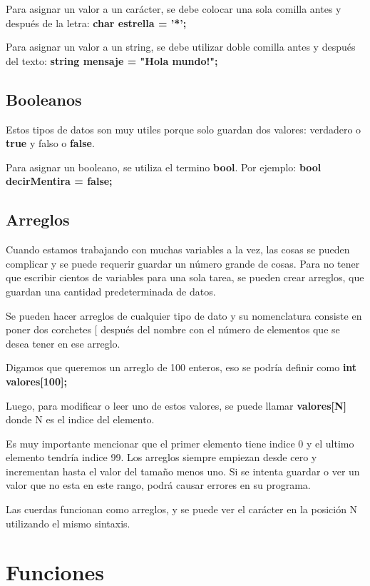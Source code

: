 \documentclass{article}
\begin{document}
Para asignar un valor a un carácter, se debe colocar una sola comilla antes y después de la letra: \textbf{char estrella = '*';}

Para asignar un valor a un string, se debe utilizar doble comilla antes y después del texto: \textbf{string mensaje = "Hola mundo!";}

\subsection{Booleanos}

Estos tipos de datos son muy utiles porque solo guardan dos valores: verdadero o \textbf{true} y falso o \textbf{false}.

Para asignar un booleano, se utiliza el termino \textbf{bool}. Por ejemplo: \textbf{bool decirMentira = false;}

\subsection{Arreglos}

Cuando estamos trabajando con muchas variables a la vez, las cosas se pueden complicar y se puede requerir guardar un número grande de cosas. Para no tener que escribir cientos de variables para una sola tarea, se pueden crear arreglos, que guardan una cantidad predeterminada de datos.

Se pueden hacer arreglos de cualquier tipo de dato y su nomenclatura consiste en poner dos corchetes $[$ después del nombre con el número de elementos que se desea tener en ese arreglo.

Digamos que queremos un arreglo de 100 enteros, eso se podría definir como \textbf{int valores[100];}

Luego, para modificar o leer uno de estos valores, se puede llamar \textbf{valores[N]} donde N es el indice del elemento.

Es muy importante mencionar que el primer elemento tiene indice 0 y el ultimo elemento tendría indice 99. Los arreglos siempre empiezan desde cero y incrementan hasta el valor del tamaño menos uno. Si se intenta guardar o ver un valor que no esta en este rango, podrá causar errores en su programa.

Las cuerdas funcionan como arreglos, y se puede ver el carácter en la posición N utilizando el mismo sintaxis.

\section{Funciones}
\end{document}
